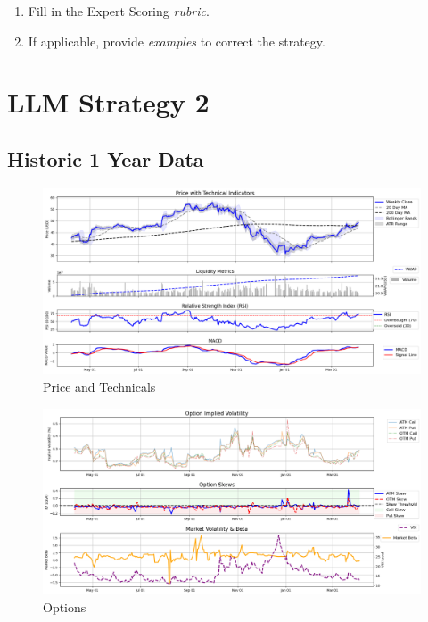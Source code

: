 \documentclass[8pt]{scrartcl}
\begin{document}
\begin{tcolorbox}[colback=blue!10, colframe=blue!60, title=\textbf{TASKS}, sharp corners=southwest]
\begin{enumerate}
    \item Fill in the Expert Scoring \textit{rubric}.
    \item If applicable, provide \textit{examples} to correct the strategy.
\end{enumerate}
\end{tcolorbox}

\newpage


\section*{LLM Strategy 2}
\label{app:s2}

\subsection*{Historic 1 Year Data}

\begin{figure}[H]
    \centering
    \includegraphics[width=1\linewidth]{judge_reviews/AAPL_M_gpt-4o-mini/2019-04-07/judge_Price_with_Technical_Indicators.png}
    \caption{Price and Technicals}
\end{figure}

\begin{figure}[H]
    \centering
    \includegraphics[width=1\linewidth]{judge_reviews/AAPL_M_gpt-4o-mini/2019-04-07/judge_Option_Implied_Volatility.png}
    \caption{Options}
\end{figure}
\end{document}
